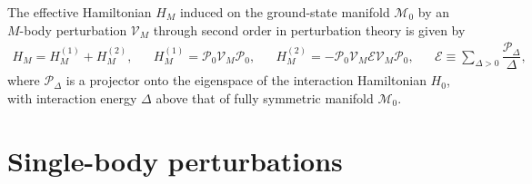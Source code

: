 \documentclass[nofootinbib,notitlepage,11pt]{revtex4-2}
\newcommand{\f}[2]{\dfrac{#1}{#2}} %
\newcommand{\1}{\mathds{1}}
\newcommand{\E}{\mathcal{E}}
\newcommand{\M}{\mathcal{M}}
\renewcommand{\P}{\mathcal{P}}
\newcommand{\V}{\mathcal{V}}
\begin{document}
The effective Hamiltonian $H_M$ induced on the ground-state manifold
$\M_0$ by an $M$-body perturbation $\V_M$ through second order in
perturbation theory is given by\cite{bravyi2011schrieffer,
  perlin2019effective}
\begin{align}
  H_M = H_M^{(1)} + H_M^{(2)},
  &&
  H_M^{(1)} = \P_0 \V_M \P_0,
  &&
  H_M^{(2)} = - \P_0 \V_M \E \V_M \P_0,
  &&
  \E \equiv \sum_{\Delta>0} \f{\P_\Delta}{\Delta},
\end{align}
where $\P_\Delta$ is a projector onto the eigenspace of the
interaction Hamiltonian $H_0$, with interaction energy $\Delta$
above that of fully symmetric manifold $\M_0$.

\section{Single-body perturbations}
\end{document}
